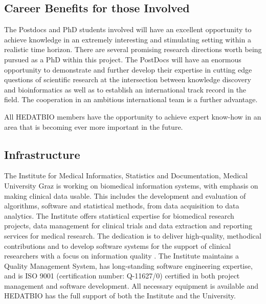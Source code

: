 \documentclass[a4paper,11pt]{article}
\begin{document}
\subsection{Career Benefits for those Involved}

The Postdocs and PhD students involved will have an excellent opportunity to achieve knowledge in an extremely interesting and stimulating setting within a realistic time horizon. There are several promising research directions worth being pursued as a PhD within this project. The PostDocs will have an enormous opportunity to demonstrate and further develop their expertise in cutting edge questions of scientific research at the intersection between knowledge discovery and bioinformatics as well as to establish an international track record in the field. The cooperation in an ambitious international team is a further advantage.

All HEDATBIO members have the opportunity to achieve expert know-how in an area that is becoming ever more important in the future.

\subsection{Infrastructure} 

The Institute for Medical Informatics, Statistics and Documentation, Medical University Graz is working on biomedical information systems, with emphasis on making clinical data usable. This includes the development and evaluation of algorithms, software and statistical methods, from data acquisition to data analytics. The Institute offers statistical expertise for biomedical research projects, data management for clinical trials and data extraction and reporting services for medical research. The dedication is to deliver high-quality, methodical contributions and to develop software systems for the support of clinical researchers with a focus on information quality \citep{Holzinger:2011:InformationQuality}. The Institute maintains a Quality Management System, has long-standing software engineering expertise, and is ISO 9001 (certification number: Q-11627/0) certified in both project management and software development. All necessary equipment is available and HEDATBIO has the full support of both the Institute and the University.
\end{document}
